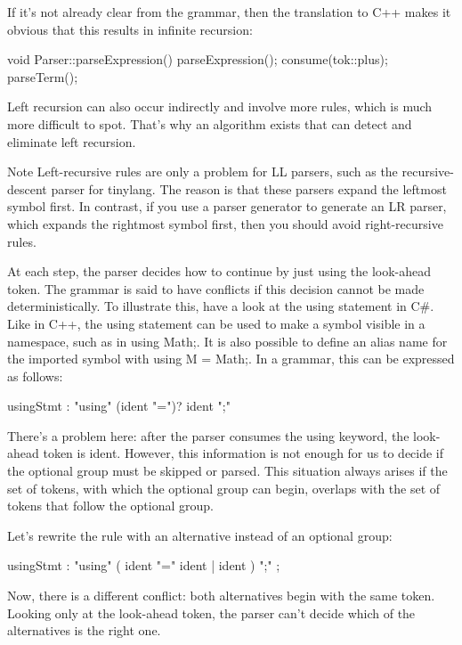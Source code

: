 If it’s not already clear from the grammar, then the translation to C++ makes it obvious that this results in infinite recursion:

\begin{cpp}
void Parser::parseExpression() {
    parseExpression();
    consume(tok::plus);
    parseTerm();
}
\end{cpp}

Left recursion can also occur indirectly and involve more rules, which is much more difficult to spot. That’s why an algorithm exists that can detect and eliminate left recursion.

\begin{myNotic}{Note}
Left-recursive rules are only a problem for LL parsers, such as the recursive-descent parser for tinylang. The reason is that these parsers expand the leftmost symbol first. In contrast, if you use a parser generator to generate an LR parser, which expands the rightmost symbol first, then you should avoid right-recursive rules.
\end{myNotic}

At each step, the parser decides how to continue by just using the look-ahead token. The grammar is said to have conflicts if this decision cannot be made deterministically. To illustrate this, have a look at the using statement in C\#. Like in C++, the using statement can be used to make a symbol visible in a namespace, such as in using Math;. It is also possible to define an alias name for the imported symbol with using M = Math;. In a grammar, this can be expressed as follows:

\begin{shell}
usingStmt : "using" (ident "=")? ident ";"
\end{shell}

There’s a problem here: after the parser consumes the using keyword, the look-ahead token is ident. However, this information is not enough for us to decide if the optional group must be skipped or parsed. This situation always arises if the set of tokens, with which the optional group can begin, overlaps with the set of tokens that follow the optional group.

Let’s rewrite the rule with an alternative instead of an optional group:

\begin{shell}
usingStmt : "using" ( ident "=" ident | ident ) ";" ;
\end{shell}

Now, there is a different conflict: both alternatives begin with the same token. Looking only at the look-ahead token, the parser can’t decide which of the alternatives is the right one.


